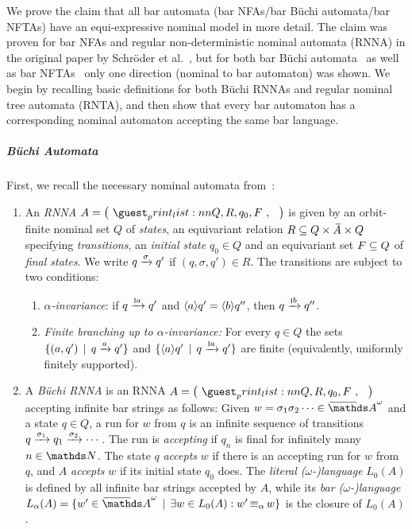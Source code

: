 \documentclass[a4paper,UKenglish,cleveref,autoref,thm-restate,numberwithinsect,final]{lipics-v2021}
\begin{document}
    We prove the claim that all bar automata (bar NFAs/bar Büchi automata/bar NFTAs) have an equi-expressive
    nominal model in more detail. The claim was proven for bar NFAs and regular non-deterministic nominal
    automata (RNNA) in the original paper by Schröder et al.~\cite[Corollary 5.14]{skmw17}, but for
    both bar Büchi automata~\cite[Proof of Thm.~6.2]{uhms21} as well as bar NFTAs~\cite[Proof of Thm.~6.3]{ps24}
    only one direction (nominal to bar automaton) was shown. We begin by recalling basic definitions for
    both Büchi RNNAs and regular nominal tree automata (RNTA), and then show that every bar automaton has
    a corresponding nominal automaton accepting the same bar language.

    \subparagraph*{Büchi Automata}

    First, we recall the necessary nominal automata from~\cite{skmw17,uhms21,ps24}:
    \begin{defn}
      \begin{enumerate}
        \item An \emph{RNNA} $A=\maketuple{Q, R, q_0, F}$ is given by an orbit-finite
          nominal set $Q$ of \emph{states}, an equivariant relation
          $R\seq Q\times \barA \times Q$ specifying \emph{transitions}, an \emph{initial state} $q_0 \in Q$
          and an equivariant set $F\subseteq Q$ of \emph{final states}. We write $q\xrightarrow{\sigma}q'$ if
          $(q,\sigma,q')\in R$. The transitions are subject to two conditions:
          \begin{enumerate}
            \item \emph{$\alpha$-invariance}: if $q\xto{\scriptnew a}q'$ and
              $\langle a \rangle q'=\langle b \rangle q''$, then $q\xto{\scriptnew b}q''$.
            \item \emph{Finite branching up to $\alpha$-invariance:} For every $q\in Q$ the sets
              $\{(a,q')\,\mid\,q\xrightarrow{a}q'\}$ and $\setw{\braket{a} q'}{q\xto{\scriptnew a} q'}$
              are finite (equivalently, uniformly finitely supported).
          \end{enumerate}
        \item A \emph{Büchi RNNA} is an RNNA $A = \maketuple{Q, R, q_0, F}$ accepting infinite bar strings
          as follows: Given $w = \sigma_1\sigma_2\cdots \in \barAw$ and a state $q \in Q$, a run for $w$
          from $q$ is an infinite sequence of transitions $q\xrightarrow{\sigma_1}q_1\xrightarrow{\sigma_2}\cdots$.
          The run is \emph{accepting} if $q_n$ is final for infinitely many $n \in \Nat$. The state $q$
          \emph{accepts} $w$ if there is an accepting run for $w$ from $q$, and $A$ \emph{accepts} $w$ if
          its initial state $q_0$ does. The \emph{literal ($\omega$-)language} $L_0(A)$ is defined by all infinite bar
          strings accepted by $A$, while its \emph{bar ($\omega$-)language} $L_\alpha(A) = \setw{w'\in \barAw}{\exists
          w \in L_0(A): w' \alphaequiv w}$ is the closure of $L_0(A)$.
      \end{enumerate}
    \end{defn}
\end{document}
